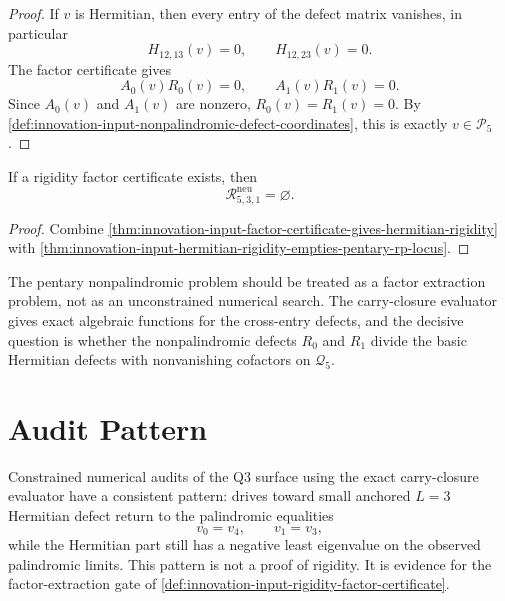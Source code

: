 \begin{proof}
If $v$ is Hermitian, then every entry of the defect matrix vanishes, in
particular
$$
H_{12,13}(v)=0,
\qquad
H_{12,23}(v)=0.
$$
The factor certificate gives
$$
A_0(v)R_0(v)=0,
\qquad
A_1(v)R_1(v)=0.
$$
Since $A_0(v)$ and $A_1(v)$ are nonzero, $R_0(v)=R_1(v)=0$. By
\autoref{def:innovation-input-nonpalindromic-defect-coordinates}, this is
exactly $v\in\mathcal P_5$.
\end{proof}

\begin{corollary}
\label{cor:innovation-input-factor-certificate-closes-pentary-three-link-gate}
If a rigidity factor certificate exists, then
$$
\mathcal R_{5,3,1}^{\mathrm{neu}}=\varnothing.
$$
\end{corollary}

\begin{proof}
Combine
\autoref{thm:innovation-input-factor-certificate-gives-hermitian-rigidity}
with
\autoref{thm:innovation-input-hermitian-rigidity-empties-pentary-rp-locus}.
\end{proof}

\begin{principle}
\label{prin:innovation-input-algebraic-extraction-over-search}
The pentary nonpalindromic problem should be treated as a factor
extraction problem, not as an unconstrained numerical search. The
carry-closure evaluator gives exact algebraic functions for the
cross-entry defects, and the decisive question is whether the
nonpalindromic defects $R_0$ and $R_1$ divide the basic Hermitian defects
with nonvanishing cofactors on $\mathcal Q_5$.
\end{principle}

\section{Audit Pattern}
\label{sec:innovation-input-hermitian-audit-pattern}

\begin{principle}
\label{prin:innovation-input-hermitian-audit-pattern}
Constrained numerical audits of the Q3 surface using the exact
carry-closure evaluator have a consistent pattern: drives toward small
anchored $L=3$ Hermitian defect return to the palindromic equalities
$$
v_0=v_4,
\qquad
v_1=v_3,
$$
while the Hermitian part still has a negative least eigenvalue on the
observed palindromic limits. This pattern is not a proof of rigidity. It
is evidence for the factor-extraction gate of
\autoref{def:innovation-input-rigidity-factor-certificate}.
\end{principle}

